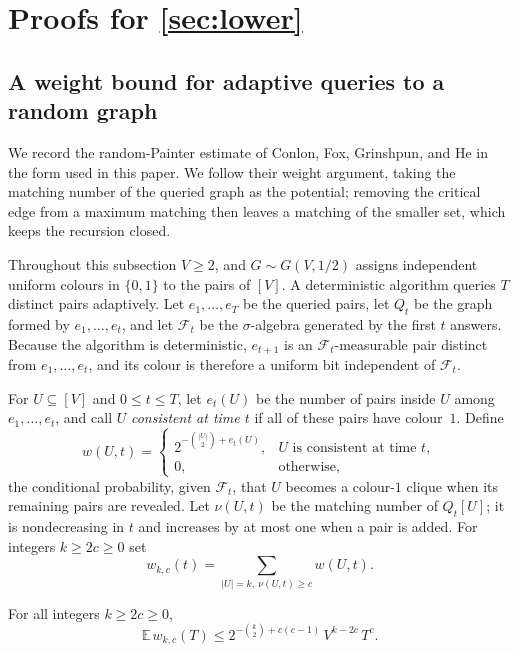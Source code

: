 \section{Proofs for \texorpdfstring{\cref{sec:lower}}{Section 4}}
\label{app:classical-lower}

\subsection{A weight bound for adaptive queries to a random graph}
\label{app:weight-bound}

We record the random-Painter estimate of Conlon, Fox, Grinshpun, and He
\cite[proof of Theorem~1]{ConlonFoxGrinshpunHe2019} in the form used in
this paper.  We follow their weight argument, taking the matching number
of the queried graph as the potential; removing the critical edge from a
maximum matching then leaves a matching of the smaller set, which keeps the
recursion closed.

Throughout this subsection $V\ge2$, and $G\sim G(V,1/2)$ assigns
independent uniform colours in $\{0,1\}$ to the pairs of $[V]$.  A
deterministic algorithm queries $T$ distinct pairs adaptively.  Let
$e_1,\ldots,e_T$ be the queried pairs, let $Q_t$ be the graph formed by
$e_1,\ldots,e_t$, and let $\mathcal F_t$ be the $\sigma$-algebra generated
by the first $t$ answers.  Because the algorithm is deterministic, $e_{t+1}$
is an $\mathcal F_t$-measurable pair distinct from $e_1,\ldots,e_t$, and its
colour is therefore a uniform bit independent of $\mathcal F_t$.

For $U\subseteq[V]$ and $0\le t\le T$, let $e_t(U)$ be the number of pairs
inside $U$ among $e_1,\ldots,e_t$, and call $U$ \emph{consistent at time
$t$} if all of these pairs have colour~$1$.  Define
\[
 w(U,t)=
 \begin{cases}
 2^{-\binom{|U|}2+e_t(U)}, & U\text{ is consistent at time }t,\\
 0,&\text{otherwise},
 \end{cases}
\]
the conditional probability, given $\mathcal F_t$, that $U$ becomes a
colour-$1$ clique when its remaining pairs are revealed.  Let $\nu(U,t)$ be
the matching number of $Q_t[U]$; it is nondecreasing in $t$ and increases by
at most one when a pair is added.  For integers $k\ge2c\ge0$ set
\[
 w_{k,c}(t)=\sum_{|U|=k,\ \nu(U,t)\ge c}w(U,t).
\]

\begin{lemma}\label{lem:weight-bound}
For all integers $k\ge2c\ge0$,
\[
 \mathbb E\,w_{k,c}(T)\le 2^{-\binom k2+c(c-1)}\,V^{k-2c}\,T^{c}.
\]
\end{lemma}

